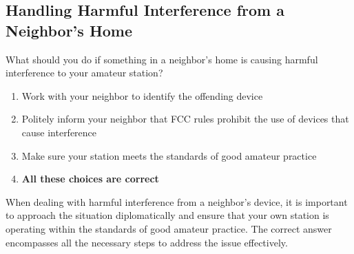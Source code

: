 \subsection{Handling Harmful Interference from a Neighbor's Home}
\label{T7B08}

\begin{tcolorbox}[colback=gray!10!white,colframe=black!75!black,title=T7B08]
What should you do if something in a neighbor’s home is causing harmful interference to your amateur station?
\begin{enumerate}[noitemsep]
    \item Work with your neighbor to identify the offending device
    \item Politely inform your neighbor that FCC rules prohibit the use of devices that cause interference
    \item Make sure your station meets the standards of good amateur practice
    \item \textbf{All these choices are correct}
\end{enumerate}
\end{tcolorbox}

When dealing with harmful interference from a neighbor's device, it is important to approach the situation diplomatically and ensure that your own station is operating within the standards of good amateur practice. The correct answer encompasses all the necessary steps to address the issue effectively.